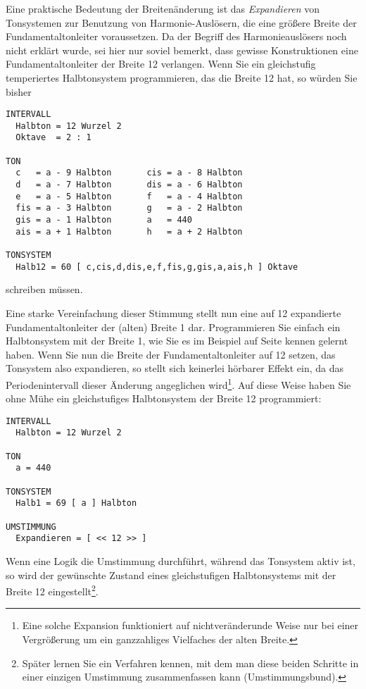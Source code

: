 Eine praktische Bedeutung der Breitenänderung ist das {\em
  Expandieren}  von Tonsystemen zur Benutzung von
Harmonie-Auslösern, die eine größere Breite der Fundamentaltonleiter voraussetzen. Da
der Begriff des Harmonieauslösers noch nicht erklärt wurde, sei hier
nur soviel bemerkt, dass gewisse Konstruktionen eine Fundamentaltonleiter der Breite 12
verlangen. Wenn Sie ein gleichstufig temperiertes Halbtonsystem
programmieren, das die Breite 12 hat, so würden Sie bisher
\begin{verbatim}
INTERVALL
  Halbton = 12 Wurzel 2
  Oktave  = 2 : 1

TON
  c   = a - 9 Halbton       cis = a - 8 Halbton
  d   = a - 7 Halbton       dis = a - 6 Halbton
  e   = a - 5 Halbton       f   = a - 4 Halbton
  fis = a - 3 Halbton       g   = a - 2 Halbton
  gis = a - 1 Halbton       a   = 440
  ais = a + 1 Halbton       h   = a + 2 Halbton

TONSYSTEM
  Halb12 = 60 [ c,cis,d,dis,e,f,fis,g,gis,a,ais,h ] Oktave
\end{verbatim}
schreiben müssen.

Eine starke Vereinfachung dieser Stimmung stellt nun eine auf 
12 expandierte Fundamentaltonleiter der (alten) Breite 1 dar. Programmieren 
Sie einfach ein Halbtonsystem mit der Breite 1, wie Sie es 
im Beispiel auf Seite \pageref{GLEICHSCH} kennen gelernt haben. Wenn Sie 
nun die Breite der Fundamentaltonleiter auf 12 setzen, das Tonsystem also expandieren, 
so stellt sich keinerlei hörbarer Effekt ein, da das Periodenintervall 
dieser Änderung angeglichen wird\footnote{Eine solche Expansion funktioniert 
auf nichtveränderunde Weise nur bei einer Vergrößerung um 
ein ganzzahliges Vielfaches der alten Breite.}. Auf diese Weise 
haben Sie ohne Mühe ein gleichstufiges Halbtonsystem der Breite 
12 programmiert:

\begin{verbatim}
INTERVALL
  Halbton = 12 Wurzel 2

TON
  a = 440

TONSYSTEM
  Halb1 = 69 [ a ] Halbton

UMSTIMMUNG
  Expandieren = [ << 12 >> ]
\end{verbatim}

Wenn eine Logik die Umstimmung  durchführt, während 
das Tonsystem  aktiv ist, so wird der gewünschte Zustand 
eines gleichstufigen Halbtonsystems mit der Breite 
12 eingestellt\footnote{Später lernen Sie ein Verfahren 
kennen, mit dem man diese beiden Schritte in einer 
einzigen Umstimmung zusammenfassen kann (Umstimmungsbund).}. 

